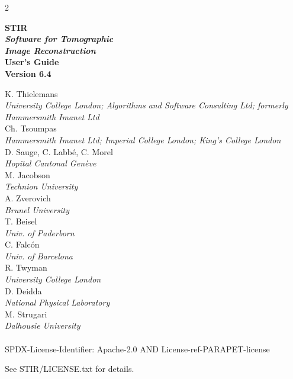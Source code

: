 \documentclass{article}
\begin{document}
\begin{spacing}{2}
\begin{center}

\textbf{
{\Huge  STIR} 
\huge
\\[1cm]
\textit{ Software for  Tomographic \\ Image Reconstruction}
}
\\[3cm]

\textbf{{\huge User's Guide\\
 Version 6.4}}
\end{center}

\end{spacing}

\large 

\noindent 
K. Thielemans \\
{\it \small University College London; Algorithms and Software Consulting Ltd; formerly Hammersmith Imanet Ltd}\\
Ch. Tsoumpas\\ 
{\it \small Hammersmith Imanet Ltd; Imperial College London; King's College London}\\
D. Sauge, C. Labb\'e, C. Morel \\
{\it \small Hopital Cantonal Gen\`eve}\\
M. Jacobson \\
{\it \small Technion University}\\
A. Zverovich \\
{\it \small Brunel University} \\
T. Beisel \\
{\it \small Univ. of Paderborn} \\
C. Falc\'{o}n \\
{\it \small Univ. of Barcelona} \\
R. Twyman \\
{\it \small University College London}\\
D. Deidda \\
{\it \small National Physical Laboratory}\\
M. Strugari \\
{\it \small Dalhousie University}
\\
\\

SPDX-License-Identifier: Apache-2.0 AND License-ref-PARAPET-license

See STIR/LICENSE.txt for details.

\newpage

\normalsize
\end{document}
